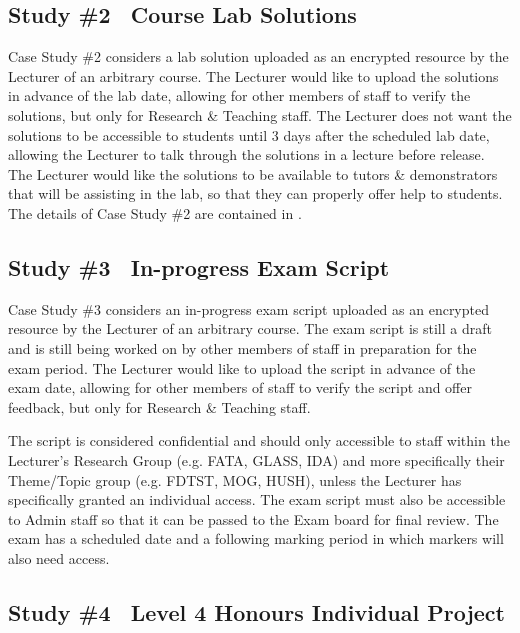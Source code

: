 \subsection{Study \#2 \textemdash\ Course Lab Solutions}
\label{subsec:analysis_case_studies_2}

Case Study \#2 considers a lab solution uploaded as an encrypted resource by the Lecturer of an arbitrary course. The Lecturer would like to upload the solutions in advance of the lab date, allowing for other members of staff to verify the solutions, but only for Research \& Teaching staff. The Lecturer does not want the solutions to be accessible to students until 3 days after the scheduled lab date, allowing the Lecturer to talk through the solutions in a lecture before release. The Lecturer would like the solutions to be available to tutors \& demonstrators that will be assisting in the lab, so that they can properly offer help to students. The details of Case Study \#2 are contained in .

\subsection{Study \#3 \textemdash\ In-progress Exam Script}
\label{subsec:analysis_case_studies_3}

Case Study \#3 considers an in-progress exam script uploaded as an encrypted resource by the Lecturer of an arbitrary course. The exam script is still a draft and is still being worked on by other members of staff in preparation for the exam period. The Lecturer would like to upload the script in advance of the exam date, allowing for other members of staff to verify the script and offer feedback, but only for Research \& Teaching staff.

The script is considered confidential and should only accessible to staff within the Lecturer's Research Group (e.g. FATA, GLASS, IDA) and more specifically their Theme\slash Topic group (e.g. FDTST, MOG, HUSH), unless the Lecturer has specifically granted an individual access. The exam script must also be accessible to Admin staff so that it can be passed to the Exam board for final review. The exam has a scheduled date and a following marking period in which markers will also need access.

\subsection{Study \#4 \textemdash\ Level 4 Honours Individual Project}
\label{subsec:analysis_case_studies_4}

